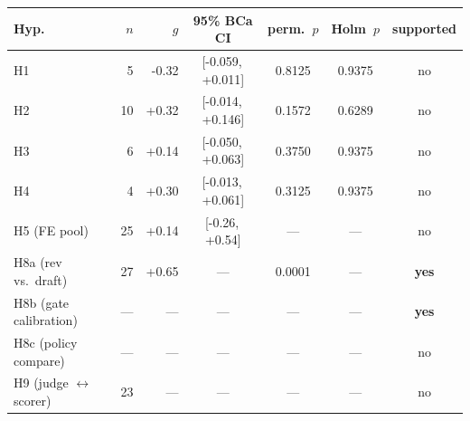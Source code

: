 \begin{tabular}{l r r c c c c}
\toprule
Hyp. & $n$ & $g$ & 95\% BCa CI & perm.~$p$ & Holm~$p$ & supported \\
\midrule
H1 & 5 & -0.32 & [-0.059,\,+0.011] & 0.8125 & 0.9375 & no \\
H2 & 10 & +0.32 & [-0.014,\,+0.146] & 0.1572 & 0.6289 & no \\
H3 & 6 & +0.14 & [-0.050,\,+0.063] & 0.3750 & 0.9375 & no \\
H4 & 4 & +0.30 & [-0.013,\,+0.061] & 0.3125 & 0.9375 & no \\
H5 (FE pool) & 25 & +0.14 & [-0.26,\,+0.54] & --- & --- & no \\
H8a (rev vs.\ draft) & 27 & +0.65 & --- & 0.0001 & --- & \textbf{yes} \\
H8b (gate calibration) & --- & --- & --- & --- & --- & \textbf{yes} \\
H8c (policy compare) & --- & --- & --- & --- & --- & no \\
H9 (judge $\leftrightarrow$ scorer) & 23 & --- & --- & --- & --- & no \\
\bottomrule
\end{tabular}
